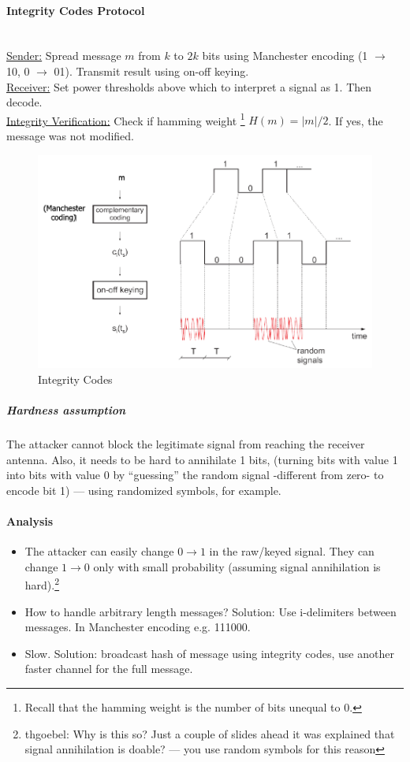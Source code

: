 \paragraph{Integrity Codes Protocol} \mbox{}\\
\underline{Sender:}
Spread message $m$ from $k$ to $2k$ bits using Manchester encoding (1 $\rightarrow$ 10, 0 $\rightarrow$ 01).
Transmit result using on-off keying.
\\
\underline{Receiver:}
Set power thresholds above which to interpret a signal as 1. Then decode.
\\
\underline{Integrity Verification:}
Check if hamming weight%
\footnote{Recall that the hamming weight is the number of bits unequal to 0.}
$H(m)=|m|/2$. If yes, the message was not modified.

\begin{figure}[h]
	\centering
	\includegraphics[scale=0.4]{images/7-integrity-code.png}
	\caption{Integrity Codes}%
	\label{fig:integrity-code}
\end{figure}

\subparagraph{Hardness assumption}
The attacker cannot block the legitimate signal from reaching the receiver antenna.
Also, it needs to be hard to annihilate 1 bits, (turning bits with value 1 into bits with value 0 by “guessing” the random signal -different from zero- to encode bit 1) --- using randomized symbols, for example.

\paragraph{Analysis}
\begin{itemize}
	\item The attacker can easily change $0 \rightarrow 1$ in the raw/keyed signal.
	They can change $1 \rightarrow 0$ only with small probability (assuming signal annihilation is hard).\footnote{thgoebel: Why is this so? Just a couple of slides ahead it was explained that signal annihilation is doable? --- you use random symbols for this reason}
	\item How to handle arbitrary length messages?
	Solution: Use i-delimiters between messages. In Manchester encoding e.g. 111000.
	\item Slow. Solution: broadcast hash of message using integrity codes, use another faster channel for the full message.
\end{itemize}


